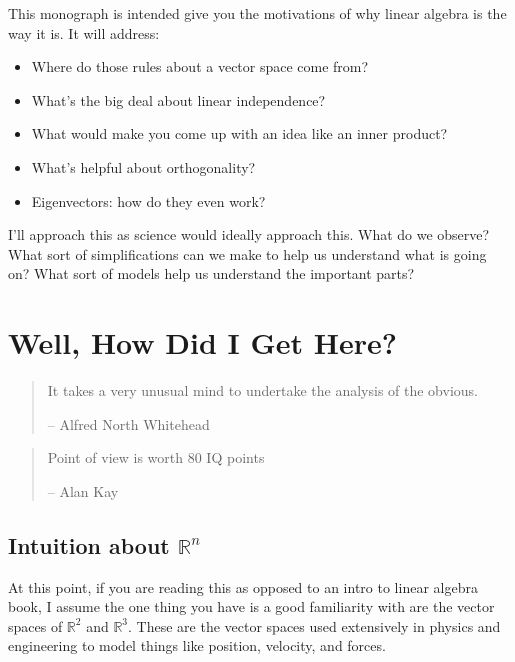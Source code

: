 \documentclass[
]{book}
\providecommand{\tightlist}{%
  \setlength{\itemsep}{0pt}\setlength{\parskip}{0pt}}
\begin{document}
This monograph is intended give you the motivations of why linear algebra is the way it is. It will address:

\begin{itemize}
\tightlist
\item
  Where do those rules about a vector space come from?
\item
  What's the big deal about linear independence?
\item
  What would make you come up with an idea like an inner product?
\item
  What's helpful about orthogonality?
\item
  Eigenvectors: how do they even work?
\end{itemize}

I'll approach this as science would ideally approach this. What do we observe? What sort of simplifications can we make to help us understand what is going on? What sort of models help us understand the important parts?

\hypertarget{well-how-did-i-get-here}{%
\chapter{Well, How Did I Get Here?}\label{well-how-did-i-get-here}}

\begin{quote}
It takes a very unusual mind to undertake the analysis of the obvious.

-- Alfred North Whitehead
\end{quote}

\begin{quote}
Point of view is worth 80 IQ points

-- Alan Kay
\end{quote}

\hypertarget{intuition-about-mathbbrn}{%
\section{\texorpdfstring{Intuition about \(\mathbb{R}^n\)}{Intuition about \textbackslash mathbb\{R\}\^{}n}}\label{intuition-about-mathbbrn}}

At this point, if you are reading this as opposed to an intro to linear algebra book, I assume the one thing you have is a good familiarity with are the vector spaces of \(\mathbb{R}^2\) and \(\mathbb{R}^3\). These are the vector spaces used extensively in physics and engineering to model things like position, velocity, and forces.
\end{document}
